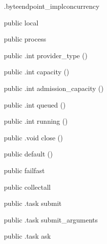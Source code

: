 \begin{CrexxClass}{.byteendpoint\_impl}{concurrency}

  \begin{Hierarchy}
  \end{Hierarchy}

  \begin{Members}

    \Factory
      {public}
      {local}
      {}

    \Factory
      {public}
      {process}
      {}

    \Method
      {public}
      {.int}
      {provider\_type}
      {()}

    \Method
      {public}
      {.int}
      {capacity}
      {()}

    \Method
      {public}
      {.int}
      {admission\_capacity}
      {()}

    \Method
      {public}
      {.int}
      {queued}
      {()}

    \Method
      {public}
      {.int}
      {running}
      {()}

    \Method
      {public}
      {.void}
      {close}
      {()}

    \Factory
      {public}
      {default}
      {()}

    \Factory
      {public}
      {failfast}
      {}

    \Factory
      {public}
      {collectall}
      {}

    \Method
      {public}
      {.task}
      {submit}
      {}

    \Method
      {public}
      {.task}
      {submit\_arguments}
      {}

    \Method
      {public}
      {.task}
      {ask}
      {}


\end{Members}
\end{CrexxClass}
